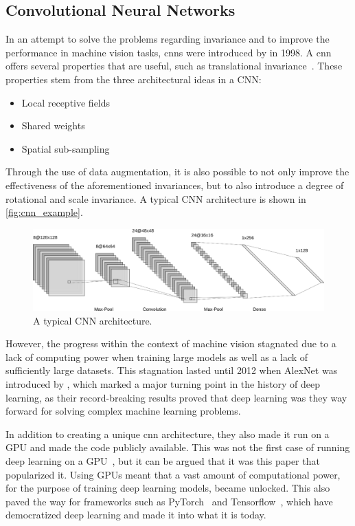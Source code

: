 \subsection{Convolutional Neural Networks}
In an attempt to solve the problems regarding invariance and to improve the performance in machine vision tasks, \glspl*{cnn} were introduced by \textcite{cnn} in 1998. A \gls*{cnn} offers several properties that are useful, such as translational invariance~\cite{cnn}. These properties stem from the three architectural ideas in a CNN:
\begin{itemize}
    \item Local receptive fields
    \item Shared weights
    \item Spatial sub-sampling
\end{itemize}
Through the use of data augmentation, it is also possible to not only improve the effectiveness of the aforementioned invariances, but to also introduce a degree of rotational and scale invariance. A typical CNN architecture is shown in \autoref{fig:cnn_example}.
\begin{figure}[H]
    \centering
    \includegraphics[width=\linewidth]{resources/related_works/cnn}
    \caption[Typical CNN Architecture]{ A typical CNN architecture. }
    \label{fig:cnn_example}
\end{figure}
\par
However, the progress within the context of machine vision stagnated due to a lack of computing power when training large models as well as a lack of sufficiently large datasets. This stagnation lasted until 2012 when AlexNet was introduced by \textcite{alexnet}, which marked a major turning point in the history of deep learning, as their record-breaking results proved that deep learning was they way forward for solving complex machine learning problems.
\par
In addition to creating a unique \gls*{cnn} architecture, they also made it run on a GPU and made the code publicly available. This was not the first case of running deep learning on a GPU~\cite{deeplearning_gpu}, but it can be argued that it was this paper that popularized it.  Using GPUs meant that a vast amount of computational power, for the purpose of training deep learning models, became unlocked. This also paved the way for frameworks such as PyTorch~\cite{pytorch} and Tensorflow~\cite{tensorflow}, which have democratized deep learning and made it into what it is today.
